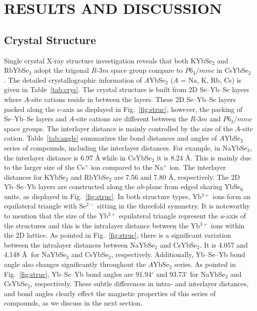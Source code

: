 \documentclass[%
 aip,
 amsmath,amssymb,
 reprint,%
]{revtex4-1}
\begin{document}
\section{\label{sec:level1}RESULTS AND DISCUSSION}
\subsection{\label{sec:level2}Crystal Structure}
Single crystal X-ray structure investigation reveals that both KYbSe$_2$ and RbYbSe$_2$ adopt the trigonal $R$-3$m$ space group compare to $P$6$_3$/$mmc$ in CsYbSe$_2$. The detailed crystallographic information of $A$YbSe$_2$ ($A$ = Na, K, Rb, Cs) is given in Table~\ref{tab:crys}. The crystal structure is built from 2D Se–Yb–Se layers where $A$-site cations reside in between the layers. These 2D Se–Yb–Se layers packed along the $c$-axis as displayed in Fig.~\ref{fig:struc}, however, the packing of Se–Yb–Se layers and $A$-site cations are different between the $R$-3$m$ and $P$6$_3$/$mmc$ space groups. The interlayer distance is mainly controlled by the size of the $A$-site cation. Table~\ref{tab:angle} summarizes the bond distances and angles of $A$YbSe$_2$ series of compounds, including the interlayer distances. For example, in NaYbSe$_2$, the interlayer distance is 6.97 \AA $~$while in CsYbSe$_2$ it is 8.24 \AA. This is mainly due to the larger size of the Cs$^+$ ion compared to the Na$^+$ ion. The interlayer distances for KYbSe$_2$ and RbYbSe$_2$ are 7.56 and 7.80 \AA, respectively. The 2D Yb–Se–Yb layers are constructed along the $ab$-plane from edged sharing YbSe$_6$ units, as displayed in Fig.~\ref{fig:struc}. In both structure types, Yb$^{3+}$ ions form an equilateral triangle with Se$^{2-}$ sitting in the threefold symmetry. It is noteworthy to mention that the size of the Yb$^{3+}$ equilateral triangle represent the $a$-axis of the structures and this is the intralayer distance between the Yb$^{3+}$ ions within the 2D lattice. As pointed in Fig.~\ref{fig:struc}, there is a significant variation between the intralayer distances between NaYbSe$_2$ and CsYbSe$_2$. It is 4.057 and 4.148 \AA$~$ for NaYbSe$_2$ and CsYbSe$_2$, respectively. Additionally, Yb–Se–Yb bond angle also changes significantly throughout the $A$YbSe$_2$ series. As pointed in Fig.~\ref{fig:struc}, Yb–Se–Yb bond angles are 91.94$^{\circ}$ and 93.73$^{\circ}$ for NaYbSe$_2$ and CsYbSe$_2$, respectively. These subtle differences in intra- and interlayer distances, and bond angles clearly effect the magnetic properties of this series of compounds, as we discuss in the next section.
\end{document}

